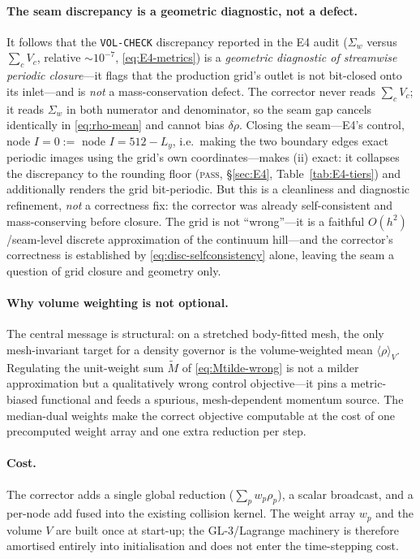 \documentclass[11pt]{article}
\theoremstyle{definition}
\theoremstyle{remark}
\begin{document}
\paragraph{The seam discrepancy is a geometric diagnostic, not a defect.}
It follows that the \texttt{VOL-CHECK} discrepancy reported in the E4 audit
($\Sigma_w$ versus $\sum_c V_c$, relative $\sim\!10^{-7}$,
\eqref{eq:E4-metrics}) is a \emph{geometric diagnostic of streamwise periodic
closure}---it flags that the production grid's outlet is not bit-closed onto its
inlet---and is \emph{not} a mass-conservation defect. The corrector never reads
$\sum_c V_c$; it reads $\Sigma_w$ in both numerator and denominator, so the seam
gap cancels identically in \eqref{eq:rho-mean} and cannot bias $\delta\rho$.
Closing the seam---E4's control, node $I{=}0:=$ node $I{=}512-L_y$, i.e.\ making
the two boundary edges exact periodic images using the grid's own
coordinates---makes (ii) exact: it collapses the discrepancy to the rounding floor
(\textsc{pass}, \S\ref{sec:E4}, Table~\ref{tab:E4-tiers}) and additionally
renders the grid bit-periodic. But this is a cleanliness and diagnostic
refinement, \emph{not} a correctness fix: the corrector was already
self-consistent and mass-conserving before closure. The grid is not ``wrong''---it
is a faithful $O(h^2)$/seam-level discrete approximation of the continuum hill---and
the corrector's correctness is established by \eqref{eq:disc-selfconsistency}
alone, leaving the seam a question of grid closure and geometry only.

\paragraph{Why volume weighting is not optional.}
The central message is structural: on a stretched body-fitted mesh, the only
mesh-invariant target for a density governor is the volume-weighted mean
$\langle\rho\rangle_V$. Regulating the unit-weight sum $\widetilde M$ of
\eqref{eq:Mtilde-wrong} is not a milder approximation but a qualitatively wrong
control objective---it pins a metric-biased functional and feeds a spurious,
mesh-dependent momentum source. The median-dual weights make the correct objective
computable at the cost of one precomputed weight array and one extra reduction per
step.

\paragraph{Cost.}
The corrector adds a single global reduction ($\sum_p w_p\rho_p$), a scalar
broadcast, and a per-node add fused into the existing collision kernel. The weight
array $w_p$ and the volume $V$ are built once at start-up; the GL-3/Lagrange
machinery is therefore amortised entirely into initialisation and does not enter
the time-stepping cost.
\end{document}
